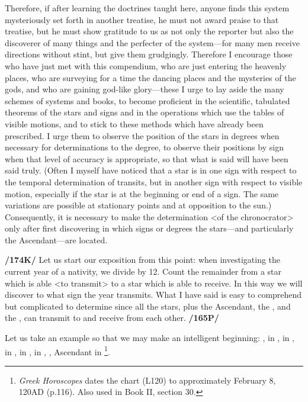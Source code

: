 Therefore, if after learning the doctrines taught here, anyone finds this system mysteriously set forth in another treatise, he must not award praise to that treatise, but he must show gratitude to us as not only the reporter but also the discoverer of many things and the perfecter of the system—for many men receive directions without stint, but give them grudgingly. Therefore I encourage those who have just met with this compendium, who are just entering the heavenly places, who are surveying for a time the dancing places and the mysteries of the gods, and who are gaining god-like glory—these I urge to lay aside the many schemes of systems and books, to become proficient in the scientific, tabulated theorems of the stars and signs and in the operations which use the tables of visible motions, and to stick to these methods which have already been prescribed. I urge them to
observe the position of the stars in degrees when necessary for determinations to the degree, to observe their positions by sign when that level of accuracy is appropriate, so that what is said will have been said truly. (Often I myself have noticed that a star is in one sign with respect to the temporal determination of transits, but in another sign with respect to visible motion, especially if the star is at the beginning or end of a sign. The same variations are possible at stationary points and at opposition to the sun.) Consequently, it is necessary to make the determination <of the chronocrator> only after first discovering in which signs or degrees the stars—and particularly the Ascendant—are located.

\textbf{/174K/} Let us start our exposition from this point: when investigating the current year of a nativity, we divide by 12. Count the remainder from a star which is able <to transmit> to a star which is able to receive. In this way we will discover to what sign the year transmits. What I have said is easy to comprehend but complicated to determine since all the stars, plus the Ascendant, the \Sun, and the \Moon,
can transmit to and receive from each other. \textbf{/165P/} 

Let us take an example so that we may make an intelligent beginning: \Sun, \Mercury\xspace in \Aquarius, \Moon\xspace in \Scorpio, \Saturn\xspace in \Cancer, \Jupiter\xspace in \Libra, \Venus in \Capricorn, \Mars, Ascendant in \Virgo
\footnote{\textit{Greek Horoscopes} dates the chart (L120) to approximately February 8, 120AD (p.116). Also used in Book II, section 30.}.

